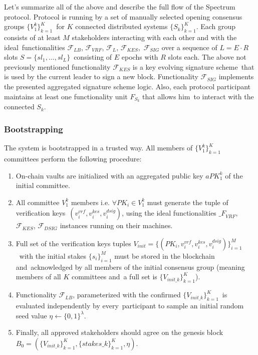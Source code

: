 Let's summarize all of the above and describe the full flow of the Spectrum protocol.
Protocol is running by a set of manually selected opening consensus groups $\{V^k_1\}_{k=1}^K$\
for $K$ connected distributed systems $\{S_k\}_{k=1}^K$.
Each group consists of at least $M$ stakeholders interacting with each other and with the ideal\
functionalities ${\mathcal{F}}_{LB}$, ${\mathcal{F}}_{VRF}$, ${\mathcal{F}}_{L}$, ${\mathcal{F}}_{KES}$,\
${\mathcal{F}}_{SIG}$ over a sequence of $L = E \cdot R$ slots ${S=\{sl_1,...,sl_L\}}$\
consisting of $E$ epochs with $R$ slots each.
The above not previously mentioned functionality ${\mathcal{F}}_{KES}$ is a key evolving signature scheme\
that is used by the current leader to sign a new block.
Functionality ${\mathcal{F}}_{SIG}$ implements the presented aggregated signature scheme logic.
Also, each protocol participant maintains at least one functionality unit $F_{S_k}$ that allows him\
to interact with the connected $S_k$.

\subsubsection{Bootstrapping}\label{subsubsec:bootstrapping}

The system is bootstrapped in a trusted way.
All members of $\{V^k_1\}_{k=1}^K$ committees perform the following procedure:
\begin{enumerate}
    \item On-chain vaults are initialized with an aggregated public key $aPK^k_1$ of the initial committee.

    \item All committee $V^k_1$ members i.e. $\forall PK_i \in V^k_1$ must generate the tuple of verification keys\
    ${(v_i^{vrf}, v_i^{kes}, v_i^{dsig})}$, using the ideal functionalities ${\mathcal_{F}}_{VRF}$,\
    ${\mathcal{F}}_{KES}$, ${\mathcal{F}}_{DSIG}$ instances running on their machines.

    \item Full set of the verification keys tuples ${V_{init} = \{(PK_i, v_i^{vrf}, v_i^{kes}, v_i^{dsig})\}_{i=1}^M}$\
    with the initial stakes $\{s_i\}_{i=1}^M$ must be stored in the blockchain and\
    acknowledged by all members of the initial consensus group (meaning members of all $K$ committees and\
    a full set is $\{V_{init\_k}\}_{k=1}^{K}$).

    \item Functionality ${\mathcal{F}}_{LB}$, parameterized with the confirmed $\{V_{init\_k}\}_{k=1}^{K}$\
    is evaluated independently by every\
    participant to sample an initial random seed value $\eta \leftarrow \{0, 1\}^\lambda$.

    \item Finally, all approved stakeholders should agree on the genesis block\
    ${B_0=\left(\{V_{init\_k}\}_{k=1}^{K}, \{stakes\_k\}_{k=1}^{K}, \eta\right)}$.
\end{enumerate}


